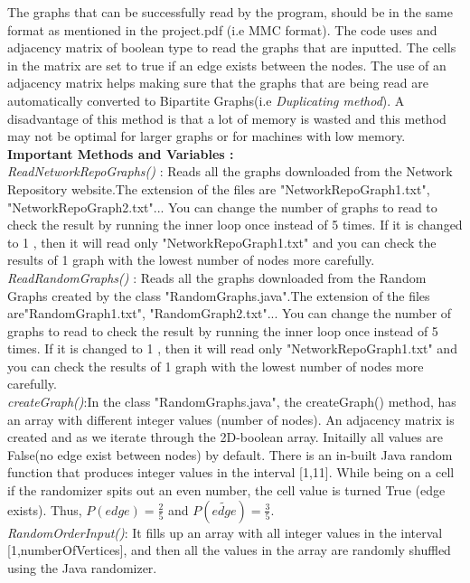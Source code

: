 \documentclass{article}
\begin{document}
The graphs that can be successfully read by the program, should be in the same format as mentioned in the project.pdf (i.e MMC format). 
The code uses and adjacency matrix of boolean type to read the graphs that are inputted. The cells in the matrix are set to true if an edge exists
between the nodes. The use of an adjacency matrix helps making sure that the graphs that are being read are automatically converted to Bipartite 
Graphs(i.e \textit{Duplicating method}). A disadvantage of this method is that a lot of memory is wasted and this method may not be optimal for larger graphs or for machines with low memory.\\


\textbf{Important Methods and Variables :}\\

\textit{ReadNetworkRepoGraphs() }: Reads all the graphs downloaded from the Network Repository website.The extension of the files are
 "NetworkRepoGraph1.txt", "NetworkRepoGraph2.txt"... You can change the number of graphs to read to check the result by running the inner
 loop once instead of 5 times. If it is changed to 1 , then it will read only "NetworkRepoGraph1.txt" and you can check the results of 1 graph with 
the lowest number of nodes more carefully. \\ 

 \textit{ReadRandomGraphs() }: Reads all the graphs downloaded from the Random Graphs created by the class "RandomGraphs.java".The
 extension of the files are"RandomGraph1.txt", "RandomGraph2.txt"... You can change the number of graphs to read to check the result by 
running the inner loop once instead of 5 times. If it is changed to 1 , then it will read only "NetworkRepoGraph1.txt" and you can check the
 results of 1 graph with the lowest number of nodes more carefully.\\

\textit{createGraph()}:In the class "RandomGraphs.java", the createGraph() method, has an array with different integer values (number of nodes).
 An adjacency matrix is created and as we iterate through the 2D-boolean array. Initailly all values are False(no edge exist between nodes)
 by default. There is an in-built Java random function that produces integer values in the interval [1,11]. While being on a cell if the randomizer spits out an even number, the cell value is turned True (edge exists). Thus, $P(edge)= \frac{2}{5}$ and $P(\widetilde{edge})=\frac{3}{5}$.\\ 

\textit{RandomOrderInput()}: It fills up an array with all integer values in the interval [1,numberOfVertices], and then all the values in the array are
randomly shuffled using the Java randomizer.\\
\end{document}
